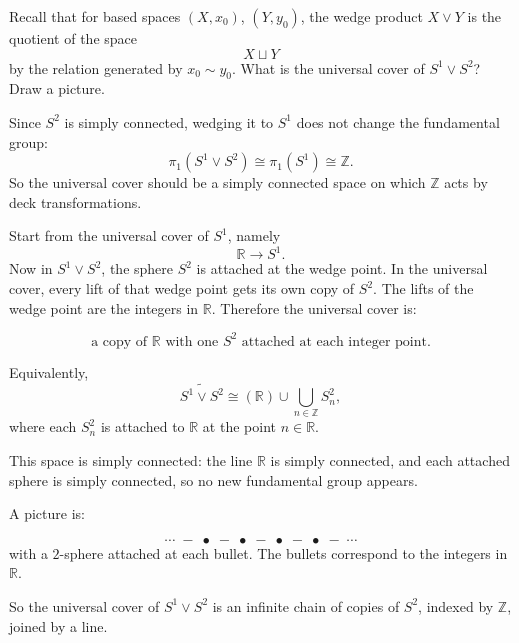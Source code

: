 \begin{problem}
Recall that for based spaces \((X,x_0)\), \((Y,y_0)\), the wedge product \(X \vee Y\) is the quotient of the space
\[
X \sqcup Y
\]
by the relation generated by \(x_0 \sim y_0\).
What is the universal cover of \(S^1 \vee S^2\)? Draw a picture.
\end{problem}

\begin{solution}
Since \(S^2\) is simply connected, wedging it to \(S^1\) does not change the fundamental group:
\[
\pi_1(S^1 \vee S^2)\cong \pi_1(S^1)\cong \mathbb{Z}.
\]
So the universal cover should be a simply connected space on which \(\mathbb{Z}\) acts by deck transformations.

Start from the universal cover of \(S^1\), namely
\[
\mathbb{R}\to S^1.
\]
Now in \(S^1\vee S^2\), the sphere \(S^2\) is attached at the wedge point. In the universal cover, every lift of that wedge point gets its own copy of \(S^2\). The lifts of the wedge point are the integers in \(\mathbb{R}\). Therefore the universal cover is:

\[
\text{a copy of }\mathbb{R}\text{ with one }S^2\text{ attached at each integer point.}
\]

Equivalently,
\[
\widetilde{S^1\vee S^2}
\cong
\left(\mathbb{R}\right)\cup \bigcup_{n\in\mathbb{Z}} S^2_n,
\]
where each \(S^2_n\) is attached to \(\mathbb{R}\) at the point \(n\in\mathbb{R}\).

This space is simply connected: the line \(\mathbb{R}\) is simply connected, and each attached sphere is simply connected, so no new fundamental group appears.

A picture is:

\[
\cdots \;-\; \bullet \;-\; \bullet \;-\; \bullet \;-\; \bullet \;-\; \cdots
\]
with a \(2\)-sphere attached at each bullet. The bullets correspond to the integers in \(\mathbb{R}\).

So the universal cover of \(S^1\vee S^2\) is an infinite chain of copies of \(S^2\), indexed by \(\mathbb{Z}\), joined by a line.
\end{solution}

